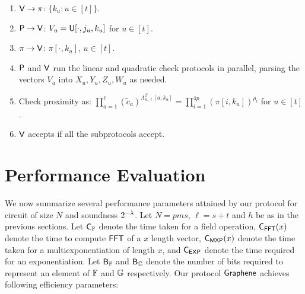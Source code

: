 {\begin{enumerate}[{\rm 1.}]
\item $\mathsf{V}\rightarrow\pi$: $\{k_u:u\in [t]\}$.
\item $\mathsf{P}\rightarrow\mathsf{V}$: $V_u=\mathsf{U}[\cdot,j_u,k_u]$ for $u\in [t]$.
\item $\pi\rightarrow\mathsf{V}$: $\pi[\cdot,k_u]$, $u\in [t]$.
\item $\mathsf{P}$ and $\mathsf{V}$ run the linear and quadratic check protocols in
parallel, parsing the vectors $V_u$ into $X_u,Y_u,Z_u,W_u$ as needed.
\item Check proximity as: $\prod_{a=1}^\ell
(\tilde{c}_a)^{\Lambda_{n,\ell}^T[a,k_u]}=\prod_{i=1}^{4p}(\pi[i,k_u])^{\rho_i}$ for $u\in [t]$.
\item $\mathsf{V}$ accepts if all the subprotocols accept.
\end{enumerate}
}
\smallskip
\section{Performance Evaluation}\label{sec:performancecompare} We now summarize several performance parameters attained by our protocol for circuit of size $N$ and soundness $2^{-\lambda}$. Let $N= pms$, $\ell = s+t$ and $h$ be as in the previous sections. Let $\mathsf{C}_\mathbb{F}$ denote the time taken for a field operation, $\mathsf{C}_\mathsf{FFT}(x)$ denote the time to compute $\mathsf{FFT}$ of a $x$ length vector, $\mathsf{C}_\mathsf{MXP}(x)$ denote the time taken for a multiexponentiation of length $x$, and $\mathsf{C}_\mathsf{EXP}$ denote the time required for an exponentiation. Let $\mathsf{B}_\mathbb{F}$ and $\mathsf{B}_\mathbb{G}$ denote the number of bits required to represent an element of $\mathbb{F}$ and $\mathbb{G}$ respectively. Our protocol $\textsf{Graphene}$ achieves following efficiency parameters: 

